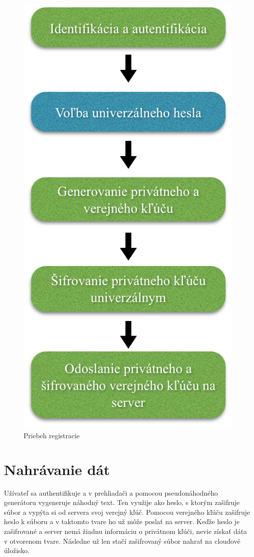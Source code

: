 		
		\begin{figure}[H]
			\begin{center}
				\includegraphics[width=0.5\linewidth]{images/registracia.png}
				\caption{Priebeh registracie }
			\end{center}
		\end{figure}
		
	
	\section{Nahrávanie dát}
	
		Užívateľ sa authentifikuje a v prehliadači a pomocou pseudonáhodného generátoru vygeneruje náhodný text. Ten využije ako heslo, s ktorým zašifruje súbor a vypýta si od servera svoj verejný kľúč. Pomocou verejného kľúču zašifruje heslo k súboru a v taktomto tvare ho už môže poslať na server. Keďže heslo je zašifrované a server nemá žiadnu informáciu o privátnom kľúči, nevie získať dáta v otvorenom tvare. Následne už len stačí zašifrovaný súbor nahrať na cloudové úložisko.
		
